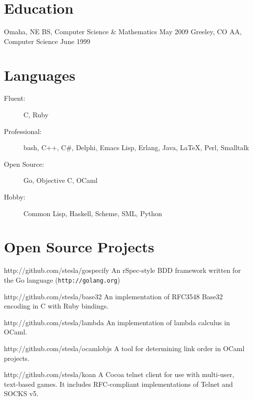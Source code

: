 \documentclass{resume}
\begin{document}
\section{Education}
\begin{itemize}
             {Omaha, NE}
             {BS, Computer Science \& Mathematics}
             {May 2009}
             {Greeley, CO}
             {AA, Computer Science}
             {June 1999}
\end{itemize}

\section{Languages}
\begin{description}
\item[Fluent:] C, Ruby
\item[Professional:] bash, C++, C\#, Delphi, Emacs Lisp, Erlang, Java, \LaTeX, Perl, Smalltalk
\item[Open Source:] Go, Objective C, OCaml
\item[Hobby:] Common Lisp, Haskell, Scheme, SML, Python
\end{description}

\section{Open Source Projects}
\begin{itemize}
             {http://github.com/stesla/gospecify}
             An rSpec-style BDD framework written for the Go language (\texttt{http://golang.org})

             {http://github.com/stesla/base32}
             An implementation of RFC3548 Base32 encoding in C with Ruby
             bindings.

             {http://github.com/stesla/lambda}
             An implementation of lambda calculus in OCaml.

             {http://github.com/stesla/ocamlobjs}
             A tool for determining link order in OCaml projects.

             {http://github.com/stesla/koan}
             A Cocoa telnet client for use with multi-user, text-based
             games. It includes RFC-compliant implementations of Telnet and
             SOCKS v5.
\end{itemize}
\end{document}
